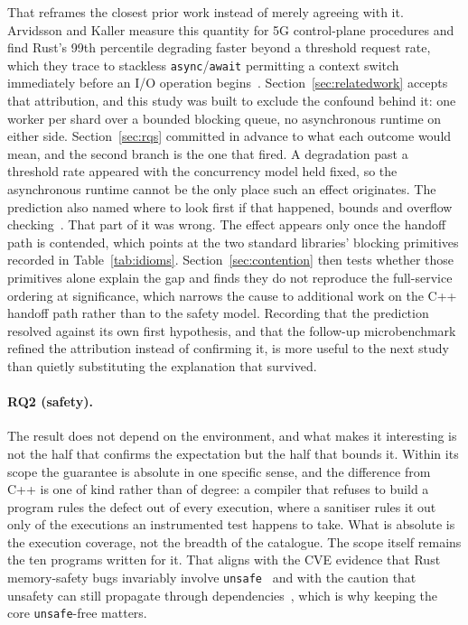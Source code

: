 \documentclass[english,twoside,openright,a4paper,censored,csm,software-track-2020]{HYthesisML}
\begin{document}
That reframes the closest prior work instead of merely agreeing with it. Arvidsson and Kaller
measure this quantity for 5G control-plane procedures and find Rust's 99th percentile degrading
faster beyond a threshold request rate, which they trace to stackless
\texttt{async}/\texttt{await} permitting a context switch immediately before an I/O operation
begins~\cite{arvidsson2025async}. Section~\ref{sec:relatedwork} accepts that attribution, and
this study was built to exclude the confound behind it: one worker per shard over a bounded
blocking queue, no asynchronous runtime on either side. Section~\ref{sec:rqs}
committed in advance to what each outcome would mean, and the second branch is the one that
fired. A degradation past a threshold rate appeared with the concurrency model held fixed, so the
asynchronous runtime cannot be the only place such an effect originates. The prediction also
named where to look first if that happened, bounds and overflow
checking~\cite{zhang2022runtime,harris2023morello}. That part of it was wrong. The effect
appears only once the handoff path is contended, which points at the two standard libraries'
blocking primitives recorded in Table~\ref{tab:idioms}. Section~\ref{sec:contention} then tests
whether those primitives alone explain the gap and finds they do not reproduce the full-service
ordering at significance, which narrows the cause to additional work on the C++ handoff path
rather than to the safety model. Recording that the prediction resolved against its own first
hypothesis, and that the follow-up microbenchmark refined the attribution instead of confirming it,
is more useful to the next study than quietly substituting the explanation that survived.

\paragraph{RQ2 (safety).} The result does not depend on the environment, and what makes it
interesting is not the half that confirms the expectation but the half that bounds it. Within
its scope the guarantee is absolute in one specific sense, and the difference from C++ is one of
kind rather than of degree: a compiler that refuses to build a program rules the defect out of
every execution, where a sanitiser rules it out only of the executions an instrumented test
happens to take. What is absolute is the execution coverage, not the breadth of the catalogue.
The scope itself remains the ten programs written for it.
That aligns with the CVE evidence that Rust memory-safety bugs invariably involve
\texttt{unsafe}~\cite{xu2021rustcve} and with the caution that unsafety can still propagate
through dependencies~\cite{evans2020rust}, which is why keeping the core \texttt{unsafe}-free
matters.
\end{document}
